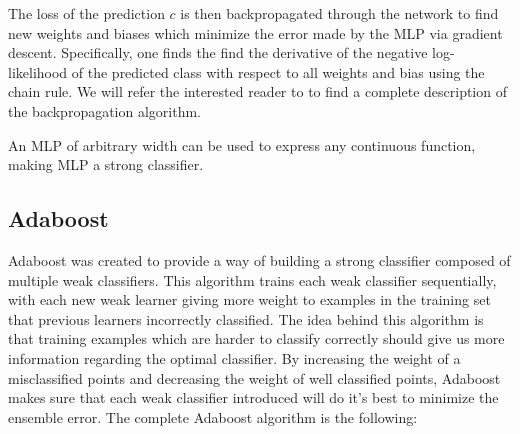 \documentclass{article}
\DeclareMathOperator*{\argmax}{arg\,max}
\begin{document}

The loss of the prediction $c$ is then backpropagated through the network to find new weights and biases which minimize the error made by the MLP via gradient descent. Specifically, one finds the find the derivative of the negative log-likelihood of the predicted class with respect to all weights and bias using the chain rule. We will refer the interested reader to \cite{Pin} to find a complete description of the backpropagation algorithm.

An MLP of arbitrary width can be used to express any continuous function, making MLP a strong classifier.

\subsection{Adaboost}

Adaboost was created to provide a way of building a strong classifier composed of multiple weak classifiers. This algorithm trains each weak classifier sequentially, with each new weak learner giving more weight to examples in the training set that previous learners incorrectly classified. The idea behind this algorithm is that training examples which are harder to classify correctly should give us more information regarding the optimal classifier\cite{Zha}. By increasing the weight of a misclassified points and decreasing the weight of well classified points, Adaboost makes sure that each weak classifier introduced will do it's best to minimize the ensemble error. The complete Adaboost algorithm is the following:
\end{document}
